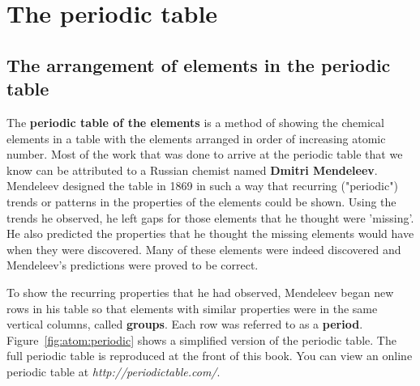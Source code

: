          \chapter{The periodic table}
    \setcounter{figure}{1}
    \setcounter{subfigure}{1}
 \label{m38760*cid9}
            \section{The arrangement of elements in the periodic table}
            \nopagebreak
      \label{m38760*id261491}The \textbf{periodic table of the elements} is a method of showing the chemical elements in a table with the elements arranged in order of increasing atomic number. Most of the work that was done to arrive at the periodic table that we know can be attributed to a Russian chemist named \textbf{Dmitri Mendeleev}. Mendeleev designed the table in 1869 in such a way that recurring ("periodic") trends or patterns in the properties of the elements could be shown. Using the trends he observed, he left gaps for those elements that he thought were 'missing'. He also predicted the properties that he thought the missing elements would have when they were discovered. Many of these elements were indeed discovered and Mendeleev's predictions were proved to be correct.\par 
      \label{m38760*id261511}To show the recurring properties that he had observed, Mendeleev began new rows in his table so that elements with similar properties were in the same vertical columns, called \textbf{groups}. Each row was referred to as a \textbf{period}. Figure~\ref{fig:atom:periodic} shows a simplified version of the periodic table. The full periodic table is reproduced at the front of this book. You can view an online periodic table at \textsl{http://periodictable.com/}. \par 
    \setcounter{subfigure}{0}
